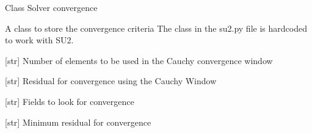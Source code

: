 \documentclass[letterpaper,10pt,english]{sphinxmanual}
\begin{document}
\begin{fulllineitems}
\label{\detokenize{modules:su2.Solver_Convergence}}
\pysigstartsignatures
{}
\pysigstopsignatures
\sphinxAtStartPar
Class Solver convergence

\sphinxAtStartPar
A class to store the convergence criteria
The class in the su2.py file is hardcoded to work with SU2.

\begin{fulllineitems}
\label{\detokenize{modules:su2.Solver_Convergence.cauchy_elems}}
\pysigstartsignatures
{}
\pysigstopsignatures
\sphinxAtStartPar
{[}str{]} Number of elements to be used in the Cauchy convergence window

\end{fulllineitems}


\begin{fulllineitems}
\label{\detokenize{modules:su2.Solver_Convergence.cauchy_eps}}
\pysigstartsignatures
{}
\pysigstopsignatures
\sphinxAtStartPar
{[}str{]} Residual for convergence using the Cauchy Window

\end{fulllineitems}


\begin{fulllineitems}
\label{\detokenize{modules:su2.Solver_Convergence.field}}
\pysigstartsignatures
{}
\pysigstopsignatures
\sphinxAtStartPar
{[}str{]} Fields to look for convergence

\end{fulllineitems}


\begin{fulllineitems}
\label{\detokenize{modules:su2.Solver_Convergence.res_min}}
\pysigstartsignatures
{}
\pysigstopsignatures
\sphinxAtStartPar
{[}str{]} Minimum residual for convergence


\end{fulllineitems}
\end{fulllineitems}
\end{document}
